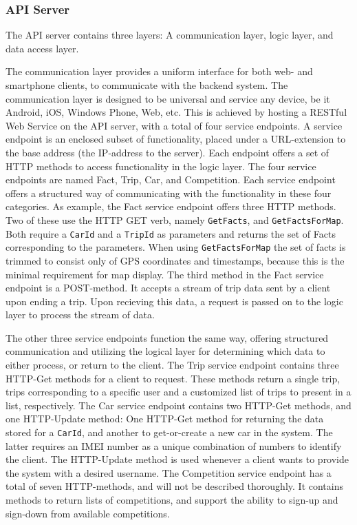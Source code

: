 \subsubsection{API Server}\label{sec:api_server}
The API server contains three layers: A communication layer, logic layer, and data access layer.

The communication layer provides a uniform interface for both web- and smartphone clients, to communicate with the backend system. The communication layer is designed to be universal and service any device, be it Android, iOS, Windows Phone, Web, etc. This is achieved by hosting a RESTful Web Service on the API server, with a total of four service endpoints. A service endpoint is an enclosed subset of functionality, placed under a URL-extension to the base address (the IP-address to the server). Each endpoint offers a set of HTTP methods to access functionality in the logic layer. The four service endpoints are named Fact, Trip, Car, and Competition. Each service endpoint offers a structured way of communicating with the functionality in these four categories. As example, the Fact service endpoint offers three HTTP methods. Two of these use the HTTP GET verb, namely \texttt{GetFacts}, and \texttt{GetFactsForMap}. Both require a \texttt{CarId} and a \texttt{TripId} as parameters and returns the set of Facts corresponding to the parameters. When using \texttt{GetFactsForMap} the set of facts is trimmed to consist only of GPS coordinates and timestamps, because this is the minimal requirement for map display. The third method in the Fact service endpoint is a POST-method. It accepts a stream of trip data sent by a client upon ending a trip. Upon recieving this data, a request is passed on to the logic layer to process the stream of data.

The other three service endpoints function the same way, offering structured communication and utilizing the logical layer for determining which data to either process, or return to the client. The Trip service endpoint contains three HTTP-Get methods for a client to request. These methods return a single trip, trips corresponding to a specific user and a customized list of trips to present in a list, respectively. The Car service endpoint contains two HTTP-Get methods, and one HTTP-Update method: One HTTP-Get method for returning the data stored for a \texttt{CarId}, and another to get-or-create a new car in the system. The latter requires an IMEI number as a unique combination of numbers to identify the client. The HTTP-Update method is used whenever a client wants to provide the system with a desired username. The Competition service endpoint has a total of seven HTTP-methods, and will not be described thoroughly. It contains methods to return lists of competitions, and support the ability to sign-up and sign-down from available competitions.

